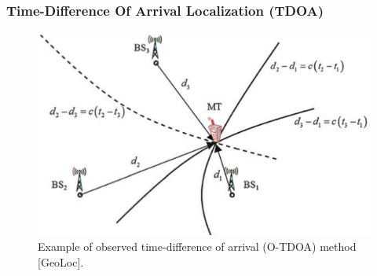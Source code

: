 \documentclass [t] {beamer} %
\begin{document}

\begin{frame} %
\frametitle{Time-Difference Of Arrival Localization (TDOA)}
\begin{figure}[h]
\includegraphics[height=0.7\textheight]{../figures/tdoa_example.png}
\caption{Example of observed time-difference of arrival (O-TDOA) method [GeoLoc].}
\label{fig:2step}
\end{figure}
\end{frame}
\end{document}
